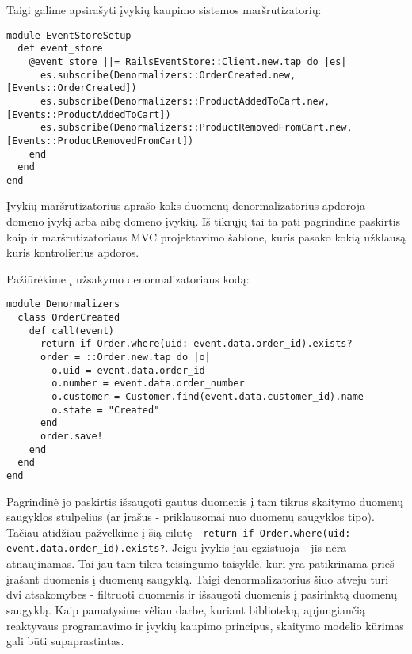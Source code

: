 Taigi galime apsirašyti įvykių kaupimo sistemos maršrutizatorių:

\begin{lstlisting}
module EventStoreSetup
  def event_store
    @event_store ||= RailsEventStore::Client.new.tap do |es|
      es.subscribe(Denormalizers::OrderCreated.new, [Events::OrderCreated])
      es.subscribe(Denormalizers::ProductAddedToCart.new, [Events::ProductAddedToCart])
      es.subscribe(Denormalizers::ProductRemovedFromCart.new, [Events::ProductRemovedFromCart])
    end
  end
end
\end{lstlisting}

Įvykių maršrutizatorius aprašo koks duomenų denormalizatorius apdoroja domeno įvykį arba aibę domeno įvykių. Iš tikrųjų tai ta pati pagrindinė paskirtis kaip ir maršrutizatoriaus MVC projektavimo šablone, kuris pasako kokią užklausą kuris kontrolierius apdoros.

Pažiūrėkime į užsakymo denormalizatoriaus kodą:

\begin{lstlisting}
module Denormalizers
  class OrderCreated
    def call(event)
      return if Order.where(uid: event.data.order_id).exists?
      order = ::Order.new.tap do |o|
        o.uid = event.data.order_id
        o.number = event.data.order_number
        o.customer = Customer.find(event.data.customer_id).name
        o.state = "Created"
      end
      order.save!
    end
  end
end
\end{lstlisting}

Pagrindinė jo paskirtis išsaugoti gautus duomenis į tam tikrus skaitymo duomenų saugyklos stulpelius (ar įrašus - priklausomai nuo duomenų saugyklos tipo). Tačiau atidžiau pažvelkime į šią eilutę - \lstinline|return if Order.where(uid: event.data.order_id).exists?|. Jeigu įvykis jau egzistuoja - jis nėra atnaujinamas. Tai jau tam tikra teisingumo taisyklė, kuri yra patikrinama prieš įrašant duomenis į duomenų saugyklą. Taigi denormalizatorius šiuo atveju turi dvi atsakomybes - filtruoti duomenis ir išsaugoti duomenis į pasirinktą duomenų saugyklą. Kaip pamatysime vėliau darbe, kuriant biblioteką, apjungiančią reaktyvaus programavimo ir įvykių kaupimo principus, skaitymo modelio kūrimas gali būti supaprastintas.


